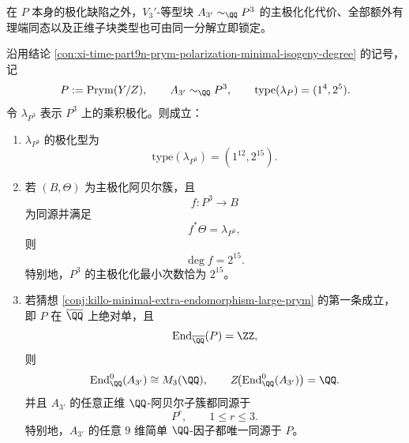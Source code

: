 在 \(P\) 本身的极化缺陷之外，\(V_3'\)-等型块 \(A_{3'}\sim_{\QQ} P^3\) 的主极化化代价、全部额外有理端同态以及正维子块类型也可由同一分解立即锁定。

\begin{theorem}\label{thm:xi-time-part9n-prym-cubed-principalization-endomorphism}
沿用结论 \ref{con:xi-time-part9n-prym-polarization-minimal-isogeny-degree} 的记号，记
\[
P:=\operatorname{Prym}(Y/Z),
\qquad
A_{3'}\sim_{\QQ} P^3,
\qquad
\mathrm{type}(\lambda_P)=(1^4,2^5).
\]
令 \(\lambda_{P^3}\) 表示 \(P^3\) 上的乘积极化。则成立：
\begin{enumerate}
  \item \(\lambda_{P^3}\) 的极化型为
  \[
  \mathrm{type}(\lambda_{P^3})=(1^{12},2^{15}).
  \]
  \item 若 \((B,\Theta)\) 为主极化阿贝尔簇，且
  \[
  f:P^3\to B
  \]
  为同源并满足
  \[
  f^*\Theta=\lambda_{P^3},
  \]
  则
  \[
  \deg f=2^{15}.
  \]
  特别地，\(P^3\) 的主极化化最小次数恰为 \(2^{15}\)。
  \item 若猜想 \ref{conj:killo-minimal-extra-endomorphism-large-prym} 的第一条成立，即 \(P\) 在 \(\overline{\QQ}\) 上绝对单，且
  \[
  \operatorname{End}_{\overline{\QQ}}(P)=\ZZ,
  \]
  则
  \[
  \operatorname{End}^0_{\QQ}(A_{3'})\cong M_3(\QQ),
  \qquad
  Z\!\bigl(\operatorname{End}^0_{\QQ}(A_{3'})\bigr)=\QQ.
  \]
  并且 \(A_{3'}\) 的任意正维 \(\QQ\)-阿贝尔子簇都同源于
  \[
  P^r,\qquad 1\le r\le 3.
  \]
  特别地，\(A_{3'}\) 的任意 \(9\) 维简单 \(\QQ\)-因子都唯一同源于 \(P\)。
\end{enumerate}
\end{theorem}
